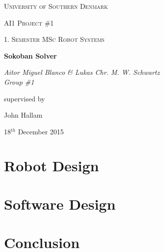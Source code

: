 \documentclass[12pt,a4paper]{article}
\begin{document}
\begin{titlepage}
	\centering
	\vfill
	{\scshape\LARGE University of Southern Denmark\par}
	\vspace{1cm}
	{\scshape\Large AI1 Project \#1\par}
	{\scshape\large 1. Semester MSc Robot Systems\par}
	\vspace{1.5cm}
	{\huge\bfseries Sokoban Solver\par}
	\vspace{2cm}
	{\Large\itshape Aitor Miguel Blanco \& Lukas Chr. M. W. Schwartz \\ Group \#1 \par}
	\vfill
	supervised by\par
	John Hallam

	\vspace{2cm}

	{\large 18$^{th}$ December 2015 \par}
\end{titlepage}

\pagebreak

\tableofcontents

\pagebreak

\listoffigures

\listoftables

\pagebreak



\pagebreak
\section{Robot Design}







\pagebreak
\section{Software Design}









\pagebreak
\section{Conclusion}

\end{document}
